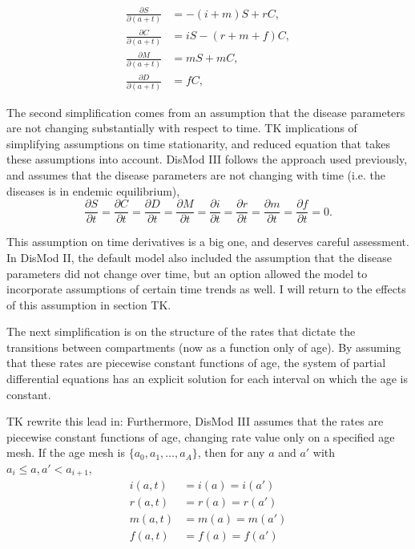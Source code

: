 \begin{align*}
\frac{\partial S}{\partial (a+t)} &= -(i + m)S + rC,\\
\frac{\partial C}{\partial (a+t)} &= iS - (r + m + f)C,\\
\frac{\partial M}{\partial (a+t)} &= mS + mC,\\
\frac{\partial D}{\partial (a+t)} &= fC,
\end{align*}

The second simplification comes from an assumption that the disease
parameters are not changing substantially with respect to time. TK
implications of simplifying assumptions on time stationarity, and
reduced equation that takes these assumptions into account.  DisMod
III follows the approach used previously, and assumes that the disease
parameters are not changing with time (i.e. the diseases is in endemic
equilibrium),
\[
\frac{\partial S}{\partial t}
=
\frac{\partial C}{\partial t}
=
\frac{\partial D}{\partial t}
=
\frac{\partial M}{\partial t}
=
\frac{\partial i}{\partial t}
=
\frac{\partial r}{\partial t}
=
\frac{\partial m}{\partial t}
=
\frac{\partial f}{\partial t}
=
0.
\]

This assumption on time derivatives is a big one, and deserves careful
assessment. In DisMod II, the default model also included the
assumption that the disease parameters did not change over time, but
an option allowed the model to incorporate assumptions of certain time
trends as well. I will return to the effects of this assumption in
section TK.

The next simplification is on the structure of the rates that dictate
the transitions between compartments (now as a function only of age).
By assuming that these rates are piecewise constant functions of age,
the system of partial differential equations has an explicit solution
for each interval on which the age is constant.

TK rewrite this lead in: Furthermore, DisMod III assumes that the rates are piecewise constant
functions of age, changing rate value only on a specified age mesh.  If
the age mesh is $\{a_0, a_1, \ldots, a_A\}$, then for any $a$ and $a'$
with $a_i \leq a, a' < a_{i+1}$,
\begin{align*}
i(a,t) &= i(a) = i(a')\\
r(a,t) &= r(a) = r(a')\\
m(a,t) &= m(a) = m(a')\\
f(a,t) &= f(a) = f(a')\\
\end{align*}

